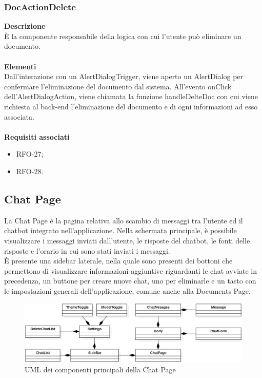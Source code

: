 \subsubsection{DocActionDelete}
\textbf{Descrizione}\\
È la componente responsabile della logica con cui l'utente può eliminare un documento.\\ \\
\textbf{Elementi}\\
Dall'interazione con un AlertDialogTrigger, viene aperto un AlertDialog per confermare l'eliminazione del documento dal sistema. All'evento onClick dell'AlertDialogAction, viene chiamata la funzione handleDelteDoc con cui viene richiesta al back-end l'eliminazione del documento e di ogni informazioni ad esso associata.\\ \\
\textbf{Requisiti associati}
\begin{itemize}
    \item RFO-27;
    \item RFO-28.
\end{itemize}



\newpage

\subsection{Chat Page}
La Chat Page è la pagina relativa allo scambio di messaggi tra l'utente ed il chatbot integrato nell'applicazione. Nella schermata principale, è possibile visualizzare i messaggi inviati dall'utente, le risposte del chatbot, le fonti delle risposte e l'orario in cui sono stati inviati i messaggi. \\
È presente una sidebar laterale, nella quale sono presenti dei bottoni che permettono di visualizzare informazioni aggiuntive riguardanti le chat avviate in precedenza, un buttone per creare nuove chat, uno per eliminarle e un tasto con le impostazioni generali dell'applicazione, comune anche alla Documents Page.
\begin{figure}[h!]
    \centering  
    \includegraphics[width=\textwidth]{ChatPageView.png}
    \caption{UML dei componenti principali della Chat Page} 
\end{figure}

